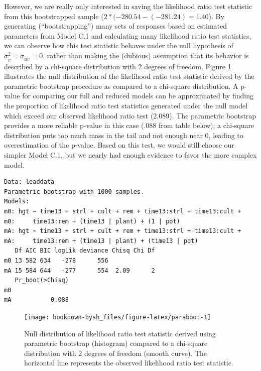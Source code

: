 \documentclass[
]{krantz}
\begin{document}
However, we are really only interested in saving the likelihood ratio test statistic from this bootstrapped sample (\(2*(-280.54 - (-281.24) = 1.40\)). By generating (``bootstrapping'') many sets of responses based on estimated parameters from Model C.1 and calculating many likelihood ratio test statistics, we can observe how this test statistic behaves under the null hypothesis of \(\sigma_{\tilde{v}}^{2} = \sigma_{\tilde{u}\tilde{v}} = 0\), rather than making the (dubious) assumption that its behavior is described by a chi-square distribution with 2 degrees of freedom. Figure \ref{fig:paraboot} illustrates the null distribution of the likelihood ratio test statistic derived by the parametric bootstrap procedure as compared to a chi-square distribution. A p-value for comparing our full and reduced models can be approximated by finding the proportion of likelihood ratio test statistics generated under the null model which exceed our observed likelihood ratio test (2.089). The parametric bootstrap provides a more reliable p-value in this case (.088 from table below); a chi-square distribution puts too much mass in the tail and not enough near 0, leading to overestimation of the p-value. Based on this test, we would still choose our simpler Model C.1, but we nearly had enough evidence to favor the more complex model.

\begin{verbatim}
Data: leaddata
Parametric bootstrap with 1000 samples.
Models:
m0: hgt ~ time13 + strl + cult + rem + time13:strl + time13:cult + 
m0:     time13:rem + (time13 | plant) + (1 | pot)
mA: hgt ~ time13 + strl + cult + rem + time13:strl + time13:cult + 
mA:     time13:rem + (time13 | plant) + (time13 | pot)
   Df AIC BIC logLik deviance Chisq Chi Df
m0 13 582 634   -278      556             
mA 15 584 644   -277      554  2.09      2
   Pr_boot(>Chisq)
m0                
mA           0.088
\end{verbatim}

\begin{figure}

{\centering \texttt{[image: bookdown-bysh\_files/figure-latex/paraboot-1]} 

}

\caption{Null distribution of likelihood ratio test statistic derived using parametric bootstrap (histogram) compared to a chi-square distribution with 2 degrees of freedom (smooth curve).  The horizontal line represents the observed likelihood ratio test statistic.}\label{fig:paraboot}
\end{figure}
\end{document}
